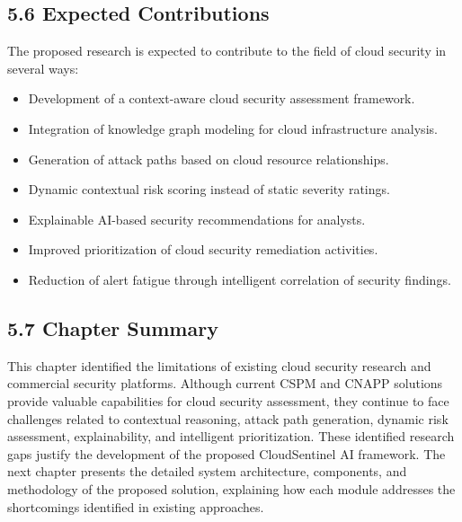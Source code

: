 \subsection{5.6 Expected Contributions}

The proposed research is expected to contribute to the field of cloud security in several ways:

\begin{itemize}
\tightlist
\item
  Development of a context-aware cloud security assessment framework.\\
\item
  Integration of knowledge graph modeling for cloud infrastructure analysis.\\
\item
  Generation of attack paths based on cloud resource relationships.\\
\item
  Dynamic contextual risk scoring instead of static severity ratings.\\
\item
  Explainable AI-based security recommendations for analysts.\\
\item
  Improved prioritization of cloud security remediation activities.\\
\item
  Reduction of alert fatigue through intelligent correlation of security findings.
\end{itemize}

\subsection{5.7 Chapter Summary}

This chapter identified the limitations of existing cloud security research and commercial security platforms. Although current CSPM and CNAPP solutions provide valuable capabilities for cloud security assessment, they continue to face challenges related to contextual reasoning, attack path generation, dynamic risk assessment, explainability, and intelligent prioritization. These identified research gaps justify the development of the proposed CloudSentinel AI framework. The next chapter presents the detailed system architecture, components, and methodology of the proposed solution, explaining how each module addresses the shortcomings identified in existing approaches.
